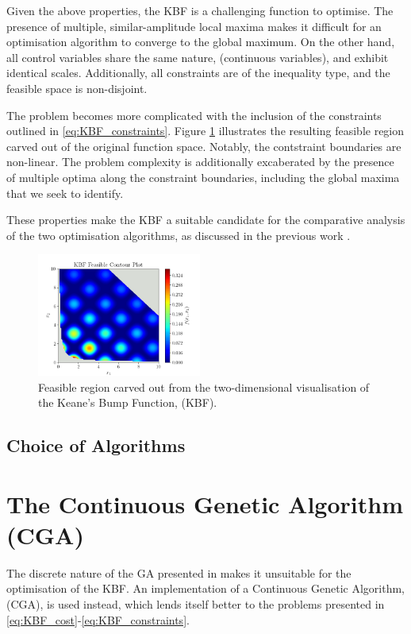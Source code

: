 \documentclass[10pt]{article}
\begin{document}
\begin{multicols}{2}
Given the above properties, the KBF is a challenging function to optimise. The presence of multiple, similar-amplitude local maxima makes it difficult for an optimisation algorithm to converge to the global maximum. On the other hand, all control variables share the same nature, (continuous variables), and exhibit identical scales. Additionally, all constraints are of the inequality type, and the feasible space is non-disjoint.

The problem becomes more complicated with the inclusion of the constraints outlined in \ref{eq:KBF_constraints}. Figure \ref{fig:KBF_Feasible} illustrates the resulting feasible region carved out of the original function space. Notably, the contstraint boundaries are non-linear. The problem complexity is additionally excaberated by the presence of multiple optima along the constraint boundaries, including the global maxima that we seek to identify.

These properties make the KBF a suitable candidate for the comparative analysis of the two optimisation algorithms, as discussed in the previous work \cite{ELBELTAGY1999639}.

\begin{figure}[H]
    \centering
    \includegraphics[width=0.48\textwidth]{../figures/KBF/KBF Feasible_contour.png}
    \captionsetup{justification=centering}
    \caption{Feasible region carved out from the two-dimensional visualisation of the Keane's Bump Function, (KBF).}
    \label{fig:KBF_Feasible}
\end{figure}
\newpage
\subsection{Choice of Algorithms}

\section{The Continuous Genetic Algorithm (CGA)}
\label{sec:CGA}

The discrete nature of the GA presented in \cite{parks2023geneticalgorithms} makes it unsuitable for the optimisation of the KBF. An implementation of a Continuous Genetic Algorithm, (CGA), is used instead, which lends itself better to the problems presented in \ref{eq:KBF_cost}-\ref{eq:KBF_constraints}.


\end{multicols}
\end{document}
